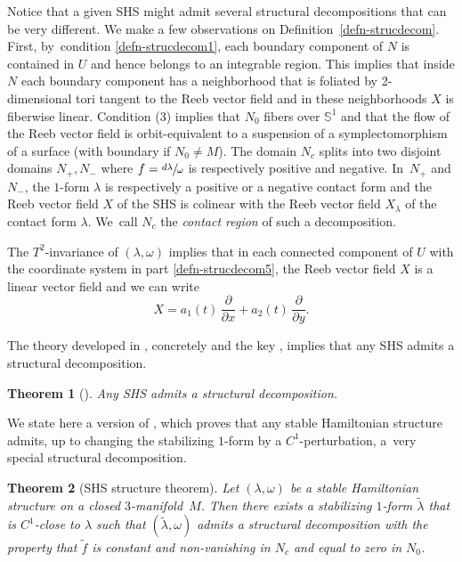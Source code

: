 \documentclass[11pt]{article}
\newcommand{\threemanifold}{$3$\nobreakdash-mani\-fold\xspace}
\newtheorem{theorem}{Theorem}[section]
\theoremstyle{definition}
\begin{document}
Notice that a given SHS might admit several structural decompositions that can be very different.
We make a few observations on Definition~\ref{defn-strucdecom}. First, by~condition \eqref{defn-strucdecom1}, each boundary component of $N$ is contained in $U$ and hence belongs to an integrable region. This implies that inside $N$ each boundary component has a neighborhood that is foliated by 2-dimensional tori tangent to the Reeb vector field and in these neighborhoods $X$ is fiberwise linear. Condition (3) implies that $N_0$ fibers over $\mathbb{S}^1$ and that the flow of the Reeb vector field is orbit-equivalent to a suspension of a symplectomorphism of a surface (with boundary if $N_0\neq M$). The domain $N_c$ splits into two disjoint domains $N_+, N_-$ where $f=\sfrac{d\lambda}{\omega}$ is respectively positive and negative. In~$N_+$ and $N_-$, the $1$-form $\lambda$ is respectively a positive or a negative contact form and the Reeb vector field $X$ of the SHS is colinear with the Reeb vector field $X_\lambda$ of the contact form $\lambda$. We~call $N_c$ the \emph{contact region} of such a decomposition.

The $T^2$-invariance of $(\lambda, \omega)$ implies that in each connected component of $U$ with the coordinate system in part \eqref{defn-strucdecom5},
the Reeb vector field $X$ is a linear vector field and we can write
\begin{equation}\label{eq-Xonregular}
X=a_1(t)\,\frac{\partial}{\partial x}+a_2(t)\,\frac{\partial}{\partial y}.
\end{equation}

The theory developed in \cite{CV1}, concretely \cite[Th.\,3.3]{CV1} and the key \cite[Prop.\,3.23]{CV1}, implies that any SHS admits a structural decomposition.
\begin{theorem}[\cite{CV1}]
Any SHS admits a structural decomposition.
\end{theorem}
We state here a version of \cite[Th.\,4.1]{CV1}, which proves that any stable Hamiltonian structure admits, up to changing the stabilizing $1$-form by a $C^1$-perturbation, a~very special structural decomposition.
\begin{theorem}[SHS structure theorem]\label{thm:struc}
Let $(\lambda,\omega)$ be a stable Hamiltonian structure on a closed \threemanifold~$M$. Then there exists a stabilizing $1$-form $\widetilde \lambda$ that is $C^1$-close to $\lambda$ such that $(\widetilde \lambda, \omega)$ admits a structural decomposition with the property that $\widetilde f$ is constant and non-vanishing in $N_c$ and equal to zero in $N_0$.
\end{theorem}
\end{document}

